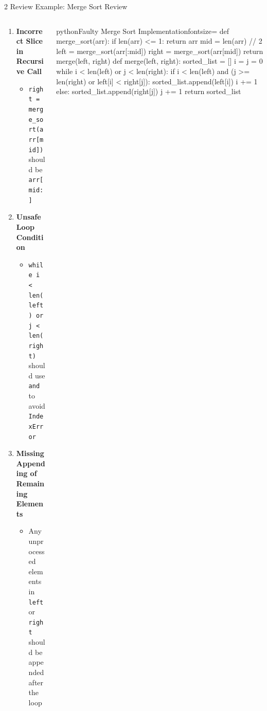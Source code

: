\documentclass[xcolor=dvipsnames, aspectratio=169]{beamer}
\begin{document}
\begin{frame}[fragile]{2 Review Example: Merge Sort Review}
  \begin{columns}[T]
    \begin{column}{0.42\textwidth}
      \begin{enumerate}
        \item \textbf{Incorrect Slice in Recursive Call}
          \begin{itemize}
            \item \texttt{right = merge\_sort(arr[mid])} should be \texttt{arr[mid:]}
          \end{itemize}
        
        \item \textbf{Unsafe Loop Condition}
          \begin{itemize}
            \item \texttt{while i < len(left) or j < len(right)} should use \texttt{and} to avoid \texttt{IndexError}
          \end{itemize}
        \item \textbf{Missing Appending of Remaining Elements}
          \begin{itemize}
            \item Any unprocessed elements in \texttt{left} or \texttt{right} should be appended after the loop
          \end{itemize}
      \end{enumerate}
    \end{column}
    
    \begin{column}{0.52\textwidth}
      \vspace{-1.5em}
      \begin{codeboxtc}{python}{Faulty Merge Sort Implementation}{}{fontsize=\scriptsize}
    def merge_sort(arr):
        if len(arr) <= 1:
            return arr
        mid = len(arr) // 2
        left = merge_sort(arr[:mid])
        right = merge_sort(arr[mid]) 
        return merge(left, right)
    def merge(left, right):
        sorted_list = []
        i = j = 0
        while i < len(left) or j < len(right):          
            if i < len(left) and (j >= len(right) or left[i] < right[j]):
                sorted_list.append(left[i])
                i += 1
            else:
                sorted_list.append(right[j])
                j += 1
        return sorted_list\end{codeboxtc}
    \end{column}
  \end{columns}
\end{frame}
\end{document}
